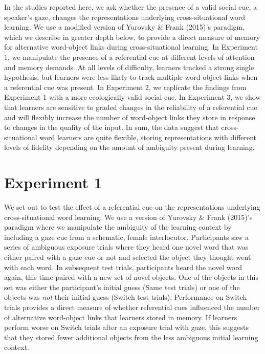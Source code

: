 \documentclass[authoryear, review]{elsarticle}
\begin{document}
In the studies reported here, we ask whether the presence of a valid
social cue, a speaker's gaze, changes the representations underlying
cross-situational word learning. We use a modified version of Yurovsky
\& Frank (2015)'s paradigm, which we describe in greater depth below, to
provide a direct measure of memory for alternative word-object links
during cross-situational learning. In Experiment 1, we manipulate the
presence of a referential cue at different levels of attention and
memory demands. At all levels of difficulty, learners tracked a strong
single hypothesis, but learners were less likely to track multiple
word-object links when a referential cue was present. In Experiment 2,
we replicate the findings from Experiment 1 with a more ecologically
valid social cue. In Experiment 3, we show that learners are sensitive
to graded changes in the reliability of a referential cue and will
flexibly increase the number of word-object links they store in response
to changes in the quality of the input. In sum, the data suggest that
cross-situational word learners are quite flexible, storing
representations with different levels of fidelity depending on the
amount of ambiguity present during learning.

\section{Experiment 1}\label{experiment-1}

We set out to test the effect of a referential cue on the
representations underlying cross-situational word learning. We use a
version of Yurovsky \& Frank (2015)'s paradigm where we manipulate the
ambiguity of the learning context by including a gaze cue from a
schematic, female interlocutor. Participants saw a series of ambiguous
exposure trials where they heard one novel word that was either paired
with a gaze cue or not and selected the object they thought went with
each word. In subsequent test trials, participants heard the novel word
again, this time paired with a new set of novel objects. One of the
objects in this set was either the participant's initial guess (Same
test trials) or one of the objects was \emph{not} their initial guess
(Switch test trials). Performance on Switch trials provides a direct
measure of whether referential cues influenced the number of alternative
word-object links that learners stored in memory. If learners perform
worse on Switch trials after an exposure trial with gaze, this suggests
that they stored fewer additional objects from the less ambiguous
initial learning context.
\end{document}
